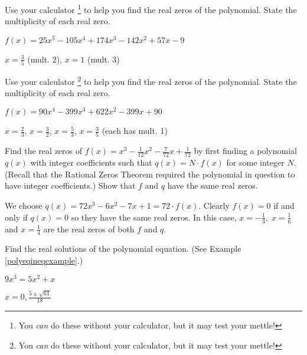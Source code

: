 \documentclass{ximera}
\begin{document}
\begin{problem}
Use your calculator \footnote{You \textit{can} do these without your calculator, but it may test your mettle!} to help you find the real zeros of the polynomial.  State the multiplicity of each real zero.

$f(x) = 25x^{5} - 105x^{4} + 174x^{3} - 142x^{2} + 57x - 9$

\begin{solution}
$x = \frac{3}{5}$ (mult. 2), $x = 1$ (mult. 3)
\end{solution}

\end{problem}

\begin{problem}\label{realzeroswcalclast}
Use your calculator \footnote{You \textit{can} do these without your calculator, but it may test your mettle!} to help you find the real zeros of the polynomial.  State the multiplicity of each real zero.

$f(x) = 90x^{4} - 399x^{3} + 622x^{2} - 399x + 90$

\begin{solution}
$x = \frac{2}{3}$, $x = \frac{3}{2}$, $x = \frac{5}{3}$, $x = \frac{3}{5}$ (each has mult. 1)
\end{solution}
\end{problem}

\begin{problem}
Find the real zeros of $f(x) = x^{3} - \frac{1}{12}x^{2} - \frac{7}{72}x + \frac{1}{72}$ by first finding a polynomial $q(x)$ with integer coefficients such that $q(x) = N \cdot f(x)$ for some integer $N$.  (Recall that the Rational Zeros Theorem required the polynomial in question to have integer coefficients.) Show that $f$ and $q$ have the same real zeros.

\begin{solution}
We choose $q(x) = 72x^{3} - 6x^{2} - 7x + 1 = 72 \cdot f(x)$.  Clearly $f(x) = 0$ if and only if $q(x) = 0$ so they have the same real zeros.  In this case, $x = -\frac{1}{3}, \; x = \frac{1}{6} \;$ and $x = \frac{1}{4}$ are the real zeros of both $f$ and $q$.
\end{solution}
\end{problem}

\begin{problem}\label{polyequexerfirst}
Find the real solutions of the polynomial equation.  (See Example \ref{polyeqineqexample}.)

$9x^{3} = 5x^{2} + x$ 

\begin{solution}
$x = 0, \frac{5\pm \sqrt{61}}{18}$
\end{solution}

\end{problem}
  
\end{document}
